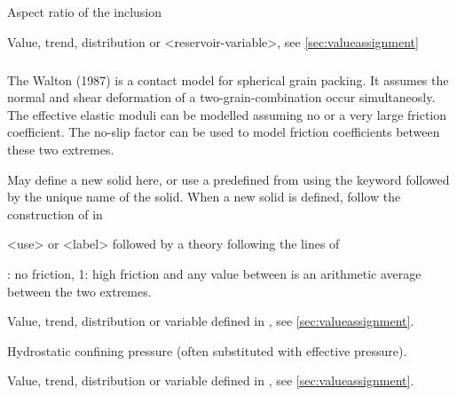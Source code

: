 {
 \slist
   \item \Description Aspect ratio of the inclusion
   \item \Argument Value, trend, distribution or <reservoir-variable>, see \autoref{sec:valueassignment}
   \item \Default
 \elist

\subparagraph{}
 \slist
   \item \Description The Walton (1987) is a contact model for spherical grain packing. It assumes the normal and shear deformation of a two-grain-combination occur simultaneosly. The effective elastic moduli can be modelled assuming no or a very large friction coefficient. The no-slip factor can be used to model friction coefficients between these two extremes.
   \item \Argument
   \item \Default 
 \elist

 \slist
   \item \Description May define a new solid here, or use a predefined  from  using the keyword  followed by the unique name of the solid. When a new solid is defined, follow the construction of  in 
   \item \Argument <use> or <label> followed by a theory following the lines of 
   \item \Default
 \elist

 \slist
   \item {}: no friction, 1: high friction and any value between is an arithmetic average between the two extremes.
   \item \Argument Value, trend, distribution or variable defined in , see \autoref{sec:valueassignment}.
   \item \Default
 \elist

 \slist
   \item \Description Hydrostatic confining pressure (often substituted with effective pressure).
   \item \Argument Value, trend, distribution or variable defined in , see \autoref{sec:valueassignment}.
   \item \Default
 \elist

}

